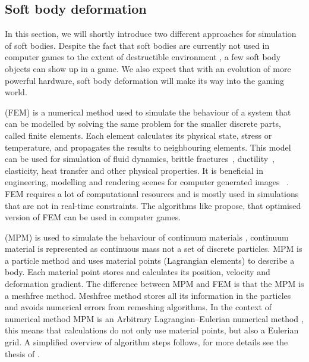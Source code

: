 \subsection{Soft body deformation}
In this section, we will shortly introduce two different approaches for simulation of soft bodies. Despite the fact that soft bodies are currently not used in computer games to the extent of destructible environment , a few  soft body objects can show up in a game. We also expect that with an evolution of more powerful hardware, soft body deformation will make its way into the gaming world.
\label{sec:softBody}

 (FEM) is a numerical method used to simulate the behaviour of a system that can be modelled by solving the same  problem for the smaller discrete parts, called finite elements. Each element calculates its physical state, \eg stress or temperature, and propagates the results to neighbouring elements. This model can be used for simulation of fluid dynamics, brittle fractures~\cite{brittlefracture}, ductility~\cite{ductilefracture}, elasticity, heat transfer and other physical properties. It is beneficial in engineering, modelling and rendering scenes for computer generated images ~\cite{Bargteil:2007:AFE}. 
FEM requires a lot of computational resources and is mostly used in simulations that are not in real-time constraints. The algorithms like \citet{femingames} propose, that optimised version of FEM can be used in computer games. 

 (MPM) is used to simulate the behaviour of continuum materials , continuum material is represented as continuous mass  not a set of discrete particles. MPM is a particle method \todo and uses material points (Lagrangian elements) to describe a body. Each material point stores and calculates its position, velocity and deformation gradient. The difference between MPM and FEM is that the MPM is a meshfree method. Meshfree method stores all its information in the particles and avoids numerical errors from remeshing algorithms. In the context of numerical method MPM is an Arbitrary Lagrangian–Eulerian numerical method \cite{ALE}, this means that calculations do not only use material points, but also a Eulerian grid. A simplified overview of algorithm steps follows, for more details see the thesis of \citet{jiang2015material}.

